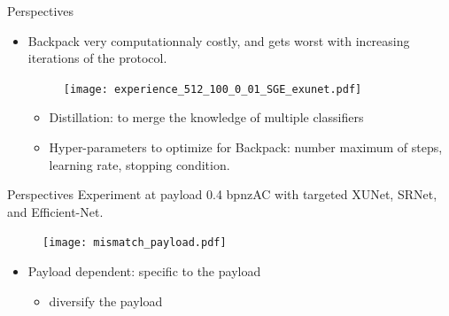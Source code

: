\documentclass[10pt,aspectratio=169]{beamer}
\begin{document}
\begin{frame}{Perspectives}

    \begin{itemize}

        \item Backpack very computationnaly costly, and gets worst with increasing iterations of the protocol. 
        
        \begin{figure}[h]
            \texttt{[image: experience\_512\_100\_0\_01\_SGE\_exunet.pdf]}
        \end{figure}

        \pause

        \begin{itemize}
            \item Distillation: to merge the knowledge of multiple classifiers
            \item Hyper-parameters to optimize for Backpack: number maximum of steps, learning rate, stopping condition.
        \end{itemize}

    \end{itemize}

\end{frame}

\begin{frame}{Perspectives}
    Experiment at payload \alert{0.4 bpnzAC} with targeted XUNet, SRNet, and Efficient-Net.
    \begin{figure}[h]
        \texttt{[image: mismatch\_payload.pdf]}
    \end{figure}
    
    \begin{itemize}
        \item Payload dependent: specific to the payload
            \begin{itemize}
                \item diversify the payload
            \end{itemize}
    \end{itemize}

\end{frame}
\end{document}
